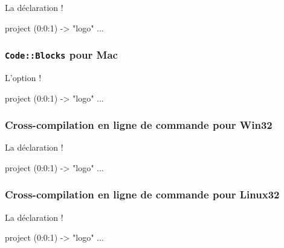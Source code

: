 La déclaration \ggs!%
\begin{galgas}
project (0:0:1) -> "logo" {
  ...
}
\end{galgas}

\subsubsection{\texttt{Code::Blocks} pour Mac}

L'option \ggs!%
\begin{galgas}
project (0:0:1) -> "logo" {
  ...
}
\end{galgas}

\subsubsection{Cross-compilation en ligne de commande pour Win32}

La déclaration \ggs!%

\begin{galgas}
project (0:0:1) -> "logo" {
  ...
}
\end{galgas}


\subsubsection{Cross-compilation en ligne de commande pour Linux32}

La déclaration \ggs!%

\begin{galgas}
project (0:0:1) -> "logo" {
  ...
}
\end{galgas}


